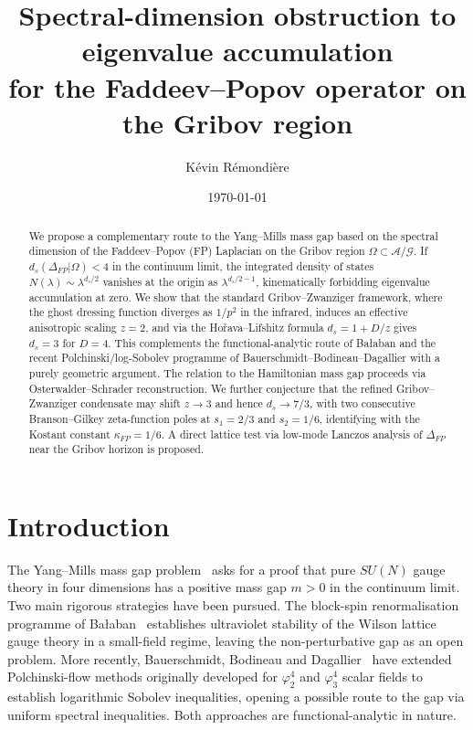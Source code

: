 \documentclass[aps,prl,reprint,nofootinbib,superscriptaddress,floatfix]{revtex4-2}
\begin{document}
\title{Spectral-dimension obstruction to eigenvalue accumulation \\ for the Faddeev--Popov operator on the Gribov region}

\author{K\'evin R\'emondi\`ere}

\date{\today}

\begin{abstract}
We propose a complementary route to the Yang--Mills mass gap based on the spectral dimension of the Faddeev--Popov (FP) Laplacian on the Gribov region $\Omega \subset \mathcal{A}/\mathcal{G}$. If $d_s(\Delta_{FP}|\Omega) < 4$ in the continuum limit, the integrated density of states $N(\lambda) \sim \lambda^{d_s/2}$ vanishes at the origin as $\lambda^{d_s/2-1}$, kinematically forbidding eigenvalue accumulation at zero. We show that the standard Gribov--Zwanziger framework, where the ghost dressing function diverges as $1/p^2$ in the infrared, induces an effective anisotropic scaling $z=2$, and via the Ho\v rava--Lifshitz formula $d_s = 1 + D/z$ gives $d_s = 3$ for $D=4$. This complements the functional-analytic route of Ba\l{}aban and the recent Polchinski/log-Sobolev programme of Bauerschmidt--Bodineau--Dagallier with a purely geometric argument. The relation to the Hamiltonian mass gap proceeds via Osterwalder--Schrader reconstruction. We further conjecture that the refined Gribov--Zwanziger condensate may shift $z\to 3$ and hence $d_s \to 7/3$, with two consecutive Branson--Gilkey zeta-function poles at $s_1 = 2/3$ and $s_2 = 1/6$, identifying with the Kostant constant $\kappa_{FP} = 1/6$. A direct lattice test via low-mode Lanczos analysis of $\Delta_{FP}$ near the Gribov horizon is proposed.
\end{abstract}

\maketitle

\section{Introduction}

The Yang--Mills mass gap problem~\cite{JaffeWitten} asks for a proof that pure $SU(N)$ gauge theory in four dimensions has a positive mass gap $m > 0$ in the continuum limit. Two main rigorous strategies have been pursued. The block-spin renormalisation programme of Ba\l{}aban~\cite{Balaban1985} establishes ultraviolet stability of the Wilson lattice gauge theory in a small-field regime, leaving the non-perturbative gap as an open problem. More recently, Bauerschmidt, Bodineau and Dagallier~\cite{BBD24,BD24} have extended Polchinski-flow methods originally developed for $\varphi^4_2$ and $\varphi^4_3$ scalar fields to establish logarithmic Sobolev inequalities, opening a possible route to the gap via uniform spectral inequalities. Both approaches are functional-analytic in nature.
\end{document}
